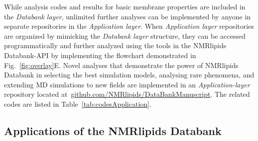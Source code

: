 \documentclass[fleqn,10pt]{wlscirep}
\begin{document}
While analysis codes and results for basic membrane properties are included in the {\it Databank layer}, unlimited further analyses can be implemented by anyone in separate repositories in the {\it Application layer}. When {\it Application layer} repositories are organized by mimicking the {\it Databank layer} structure, they can be accessed programmatically and further analyzed using the tools in the NMRlipids Databank-API by implementing the flowchart demonstrated in Fig.~\ref{fig:overlay}E. Novel analyses that demonstrate the power of NMRlipids Databank in selecting the best simulation models, analysing rare phenomena, and extending MD simulations to new fields are implemented in an {\it Application-layer} repository located at~\href{https://github.com/NMRlipids/DataBankManuscript}{github.com/NMRlipids/DataBankManuscript}. The related codes are listed in Table~\ref{tab:codesApplication}.


\subsection{Applications of the NMRlipids Databank}
\end{document}
